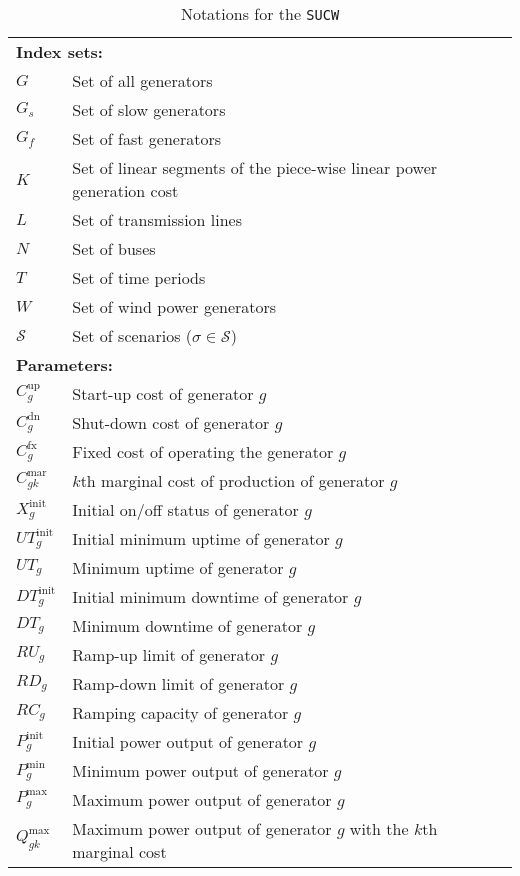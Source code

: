 \begin{table}[H]
	\centering
	\caption{Notations for the \texttt{SUCW}}
	\begin{tabular}{ll}
		\toprule
		\multicolumn{2}{l}{\textbf{Index sets:}} \\
		$G$ & Set of all generators \\
		$G_s$ & Set of slow generators \\
		$G_f$ & Set of fast generators \\
		$K$ & Set of linear segments of the piece-wise linear power generation cost \\
		$L$ & Set of transmission lines \\
		$N$ & Set of buses \\
		$T$ & Set of time periods \\
		$W$ & Set of wind power generators \\
		$\mathcal{S}$ & Set of scenarios ($\sigma\in\mathcal{S}$) 		\\ \midrule
		\multicolumn{2}{l}{\textbf{Parameters:}} \\
		$C^\text{up}_g$ & Start-up cost of generator $g$ \\
		$C^\text{dn}_g$ & Shut-down cost of generator $g$ \\
		$C^\text{fx}_g$ & Fixed cost of operating the generator $g$ \\
		$C^\text{mar}_{gk}$ & $k$th marginal cost of production of generator $g$ \\
		$X^\text{init}_g$ & Initial on/off status of generator $g$ \\
		$UT^\text{init}_g$ & Initial minimum uptime of generator $g$ \\
		$UT_g$ & Minimum uptime of generator $g$ \\
		$DT^\text{init}_g$ & Initial minimum downtime of generator $g$ \\
		$DT_g$ & Minimum downtime of generator $g$ \\
		$RU_g$ & Ramp-up limit of generator $g$ \\
		$RD_g$ & Ramp-down limit of generator $g$ \\
		$RC_g$ & Ramping capacity of generator $g$ \\
		$P^\text{init}_g$ & Initial power output of generator $g$ \\
		$P^\text{min}_g$ & Minimum power output of generator $g$ \\
		$P^\text{max}_g$ & Maximum power output of generator $g$ \\
		$Q^\text{max}_{gk}$ & Maximum power output of generator $g$ with the $k$th marginal cost \\

\end{tabular}
\end{table}
